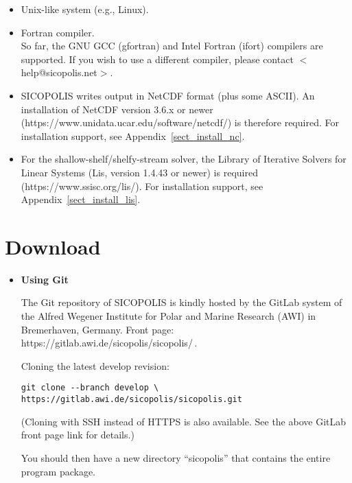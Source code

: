 \documentclass[12pt,a4paper]{article}
\begin{document}
\begin{itemize}

\item Unix-like system (e.g., Linux).

\item Fortran compiler.
\\
So far, the GNU GCC (gfortran) and Intel Fortran (ifort) compilers are supported. If you wish to use a different compiler, please contact $<$help@sicopolis.net$>$.

\item SICOPOLIS writes output in NetCDF format (plus some ASCII). An installation of NetCDF version 3.6.x or newer (https://www.unidata.ucar.edu/software/netcdf/) is therefore required. For installation support, see Appendix~\ref{sect_install_nc}.

\item For the shallow-shelf/shelfy-stream solver, the Library of Iterative Solvers for Linear Systems (Lis, version 1.4.43 or newer) is required (https://www.ssisc.org/lis/). For installation support, see Appendix~\ref{sect_install_lis}.

\end{itemize}

\section{Download}

\begin{itemize}

\item \textbf{Using Git}

The Git repository of SICOPOLIS is kindly hosted by the GitLab system of the Alfred Wegener Institute for Polar and Marine Research (AWI) in Bremerhaven, Germany. Front page: https://gitlab.awi.de/sicopolis/sicopolis/\,.

Cloning the latest develop revision:

\hspace*{1.5em}\verb+git clone --branch develop \+
\\[-1ex]
\hspace*{3.65em}\verb+https://gitlab.awi.de/sicopolis/sicopolis.git+

(Cloning with SSH instead of HTTPS is also available. See the above GitLab front page link for details.)

You should then have a new directory ``sicopolis'' that contains the entire program package.

\end{itemize}
\end{document}

